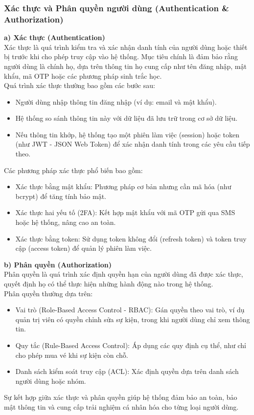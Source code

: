 \subsubsection{Xác thực và Phân quyền người dùng (Authentication \& Authorization)}
\indent \indent \textbf{a) Xác thực (Authentication)}\\
\indent Xác thực là quá trình kiểm tra và xác nhận danh tính của người dùng hoặc thiết bị trước khi cho phép truy cập vào hệ thống. Mục tiêu chính là đảm bảo rằng người dùng là chính họ, dựa trên thông tin họ cung cấp như tên đăng nhập, mật khẩu, mã OTP hoặc các phương pháp sinh trắc học. \\
\indent Quá trình xác thực thường bao gồm các bước sau:
\begin{itemize}
    \item[1.] Người dùng nhập thông tin đăng nhập (ví dụ: email và mật khẩu).
    \item[2.] Hệ thống so sánh thông tin này với dữ liệu đã lưu trữ trong cơ sở dữ liệu.
    \item[3.] Nếu thông tin khớp, hệ thống tạo một phiên làm việc (session) hoặc token (như JWT - JSON Web Token) để xác nhận danh tính trong các yêu cầu tiếp theo.
\end{itemize}
\indent \indent Các phương pháp xác thực phổ biến bao gồm:
\begin{itemize}
    \item[-] Xác thực bằng mật khẩu: Phương pháp cơ bản nhưng cần mã hóa (như bcrypt) để tăng tính bảo mật.
    \item[-] Xác thực hai yếu tố (2FA): Kết hợp mật khẩu với mã OTP gửi qua SMS hoặc hệ thống, nâng cao an toàn.
    \item[-] Xác thực bằng token: Sử dụng token không đổi (refresh token) và token truy cập (access token) để quản lý phiên làm việc.
\end{itemize}
\indent \indent \textbf{b) Phân quyền (Authorization)}\\
\indent Phân quyền là quá trình xác định quyền hạn của người dùng đã được xác thực, quyết định họ có thể thực hiện những hành động nào trong hệ thống. \\
\indent Phân quyền thường dựa trên:
\begin{itemize}
    \item[-] Vai trò (Role-Based Access Control - RBAC): Gán quyền theo vai trò, ví dụ quản trị viên có quyền chỉnh sửa sự kiện, trong khi người dùng chỉ xem thông tin.
    \item[-] Quy tắc (Rule-Based Access Control): Áp dụng các quy định cụ thể, như chỉ cho phép mua vé khi sự kiện còn chỗ.
    \item[-] Danh sách kiểm soát truy cập (ACL): Xác định quyền dựa trên danh sách người dùng hoặc nhóm.
\end{itemize}
\indent \indent Sự kết hợp giữa xác thực và phân quyền giúp hệ thống đảm bảo an toàn, bảo mật thông tin và cung cấp trải nghiệm cá nhân hóa cho từng loại người dùng.

